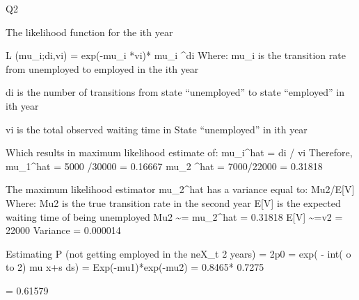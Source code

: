 \documentclass[a4paper,12pt]{article}
\begin{document}
Q2
\item  
The likelihood function for the ith year \item 
L (mu_i;di,vi) = exp(-mu_i *vi)* mu_i ^di 
Where:
mu_i is the transition rate from unemployed to employed in the ith year \item 
\medskip 
di is the number of transitions from state “unemployed” to state “employed”
in ith year \item 
vi is the total observed waiting time in State “unemployed” in ith year \item 
\item  
Which results in maximum likelihood estimate of:
mu_i^hat = di / vi
Therefore,
mu_1^hat = 5000 /30000 = 0.16667 
mu_2 ^hat = 7000/22000 = 0.31818 
\item 
The maximum likelihood estimator mu_2^hat has a variance equal to:
Mu2/E[V] 
Where:
Mu2 is the true transition rate in the second year
E[V] is the expected waiting time of being unemployed
Mu2 \sim = mu_2^hat = 0.31818
E[V] \sim =v2 = 22000 
Variance = 0.000014 
\item 
Estimating
P (not getting employed in the neX_{t} 2 years) = 2p0 = exp( - int( o to 2) mu x+s ds) 
= Exp(-mu1)*exp(-mu2) 
= 0.8465* 0.7275 \item 
= 0.61579 \item 
\end{document}
